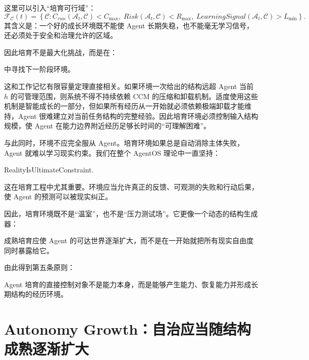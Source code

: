 这里可以引入“培育可行域”：
\[
\mathcal F_{\mathcal C}(t)
=
\left\{
\mathcal C:
C_{run}(\mathcal A_t,\mathcal C)
<
C_{\max},
\;
Risk(\mathcal A_t,\mathcal C)
<
R_{\max},
\;
LearningSignal(\mathcal A_t,\mathcal C)
>
L_{\min}
\right\}.
\]
其含义是：一个好的成长环境既不能使 Agent 长期失稳，也不能毫无学习信号，还必须处于安全和治理允许的区域。

因此培育不是最大化挑战，而是在：
\begin{statementbox}
\centering
{}
\end{statementbox}
中寻找下一阶段环境。

这和工作记忆有限容量定理直接相关。如果环境一次给出的结构远超 Agent 当前 $h$ 的可管理范围，则系统不得不持续依赖 CCM 的压缩和卸载机制。适度使用这些机制是智能成长的一部分，但如果所有经历从一开始就必须依赖极端卸载才能维持，Agent 很难建立对当前任务结构的完整经验。因此培育环境必须控制输入结构规模，使 Agent 在能力边界附近经历足够长时间的“可理解困难”。

与此同时，环境不应完全服从 Agent。培育环境如果总是自动消除主体失败，Agent 就难以学习现实约束。我们在整个 AgentOS 理论中一直坚持：
\begin{statementbox}
RealityIsUltimateConstraint.
\end{statementbox}
这在培育工程中尤其重要。环境应当允许真正的反馈、可观测的失败和行动后果，使 Agent 的预测可以被现实纠正。

因此，培育环境既不是“温室”，也不是“压力测试场”。它更像一个动态的结构生成器：
\begin{statementbox}
\centering
{}
\end{statementbox}

成熟培育应使 Agent 的可达世界逐渐扩大，而不是在一开始就把所有现实自由度同时暴露给它。

由此得到第五条原则：
\begin{proposition*}
Agent 培育的直接控制对象不是能力本身，而是能够产生能力、恢复能力并形成长期结构的经历环境。
\end{proposition*}

\section{Autonomy Growth：自治应当随结构成熟逐渐扩大}

